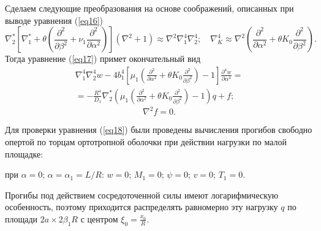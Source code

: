 \documentclass[press]{vestnik}
\begin{document}
Сделаем следующие преобразования на основе соображений, описанных при выводе 
уравнения (\ref{eq16})
\[
\nabla_{2}^{\ast } \left[ {\nabla_{1}^{\ast } +\theta \left( 
{\frac{\partial^{2}}{\partial \beta^{2}}+\nu_{1} \frac{\partial 
^{2}}{\partial \alpha^{2}}} \right)} \right]\left( {\nabla^{2}+1} 
\right)\approx \nabla^{2}\nabla_{1}^{4} \nabla_{2}^{4} ;
\quad
\nabla_{K}^{4} \approx \nabla^{2}\left( {\frac{\partial^{2}}{\partial 
\alpha^{2}}+\theta K_{0} \frac{\partial^{2}}{\partial \beta^{2}}} 
\right).
\]
Тогда уравнение (\ref{eq17}) примет окончательный вид
\begin{multline}
\label{eq18}
\nabla_{1}^{4} \nabla_{2}^{4} w-4b_{1}^{4} \left[ {\mu_{1} \left( 
{\frac{\partial^{2}}{\partial \alpha^{2}}+\theta K_{0} \frac{\partial 
^{2}}{\partial \beta^{2}}} \right)-1} \right]\frac{\partial^{4}w}{\partial 
\alpha^{4}}=\\
=-\frac{R^{4}}{D_{1} }\nabla_{2}^{\ast } \left( {\mu_{1} 
\left( {\frac{\partial^{2}}{\partial \alpha^{2}}+\theta K_{0} 
\frac{\partial^{2}}{\partial \beta^{2}}} \right)-1} \right)q+f;
\end{multline}
\[
\nabla^{2}f=0.
\]

Для проверки уравнения (\ref{eq18}) были проведены вычисления прогибов свободно 
опертой по торцам ортотропной оболочки при действии нагрузки по малой 
площадке: 

при $\alpha =0$; $\alpha =\alpha_{1} =L/R$: $w=0$; $M_{1} =0$; 
$\psi =0$; $v=0$; $T_{1} =0$.

Прогибы под действием сосредоточенной силы имеют логарифмическую 
особенность, поэтому приходится распределять равномерно эту нагрузку $q$ по 
площади $2a\times 2\beta_{1} R$ с центром $\xi_{0} =\frac{x_{0} }{R}$.
\end{document}
